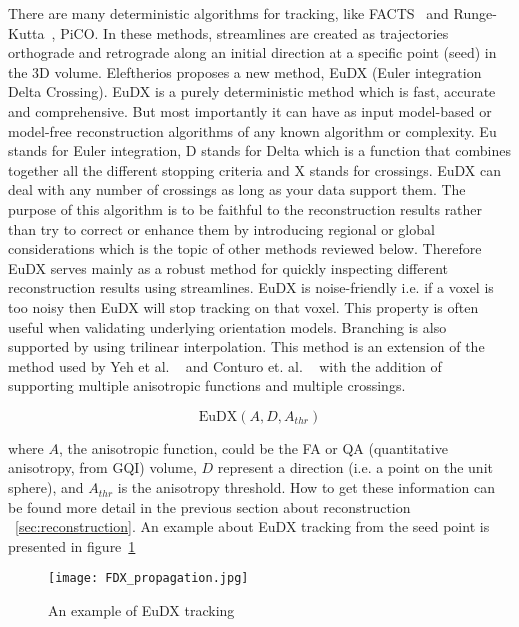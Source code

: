 There are many deterministic algorithms for tracking, like FACTS~\cite{mori1999tracking} and Runge-Kutta~\cite{basser2000vivo}, PiCO. In these methods, streamlines are created as trajectories orthograde and retrograde along an initial direction at a specific point (seed) in the 3D volume. Eleftherios proposes a new method, EuDX (Euler integration Delta Crossing). EuDX is a purely deterministic method which is fast, accurate and comprehensive. But most importantly it can have as input model-based or model-free reconstruction algorithms of any known algorithm or complexity. Eu stands for Euler integration, D stands for Delta which is a function that combines together all the different stopping criteria and X stands for crossings. EuDX can deal with any number of crossings as long as your data support them. The purpose of this algorithm is to be faithful to the reconstruction results rather than try to correct or enhance them by introducing regional or global considerations which is the topic of other methods reviewed below. Therefore EuDX serves mainly as a robust method for quickly inspecting different reconstruction results using streamlines. EuDX is noise-friendly i.e. if a voxel is too noisy then EuDX will stop tracking on that voxel. This property is often useful when validating underlying orientation models. Branching is also supported by using trilinear interpolation. This method is an extension of the method used by Yeh et al. ~\cite{yeh2010qsampling} and Conturo et. al. ~\cite{conturo1999tracking} with the addition of supporting multiple anisotropic functions and multiple crossings.

\begin{equation}
  \label{eq:EuDX}
  \mathrm{EuDX}(A, D, A_{thr})
\end{equation}

where $A$, the anisotropic function, could be the FA or QA (quantitative anisotropy, from GQI) volume, $D$ represent a direction (i.e. a point on the unit sphere), and $A_{thr}$ is the anisotropy threshold. How to get these information can be found more detail in the previous section about reconstruction ~\ref{sec:reconstruction}. An example about EuDX tracking from the seed point is presented in figure~\ref{Fig:EuDXexample}

\begin{figure} 
  \centering 
  \texttt{[image: FDX\_propagation.jpg]}
  \caption{An example of EuDX tracking}
  \label{Fig:EuDXexample}
\end{figure}


